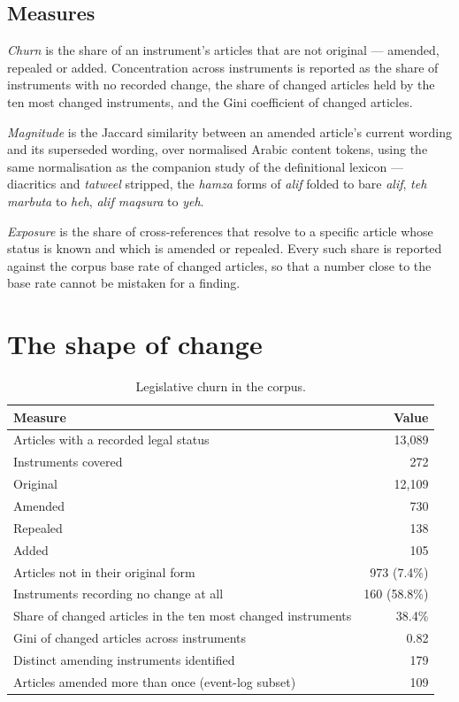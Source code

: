 \documentclass[11pt]{article}
\begin{document}
\subsection{Measures}

\emph{Churn} is the share of an instrument's articles that are not original
--- amended, repealed or added. Concentration across instruments is reported
as the share of instruments with no recorded change, the share of changed
articles held by the ten most changed instruments, and the Gini coefficient of
changed articles.

\emph{Magnitude} is the Jaccard similarity between an amended article's
current wording and its superseded wording, over normalised Arabic content
tokens, using the same normalisation as the companion study of the
definitional lexicon --- diacritics and \emph{tatweel} stripped, the
\emph{hamza} forms of \emph{alif} folded to bare \emph{alif}, \emph{teh
marbuta} to \emph{heh}, \emph{alif maqsura} to \emph{yeh}.

\emph{Exposure} is the share of cross-references that resolve to a specific
article whose status is known and which is amended or repealed. Every such
share is reported against the corpus base rate of changed articles, so that a
number close to the base rate cannot be mistaken for a finding.

\section{The shape of change}

\begin{table}[t]
\centering
\small
\begin{tabular}{lr}
\toprule
\textbf{Measure} & \textbf{Value} \\
\midrule
Articles with a recorded legal status & 13,089 \\
Instruments covered & 272 \\
\midrule
Original & 12,109 \\
Amended & 730 \\
Repealed & 138 \\
Added & 105 \\
\midrule
Articles not in their original form & 973 (7.4\%) \\
\midrule
Instruments recording no change at all & 160 (58.8\%) \\
Share of changed articles in the ten most changed instruments & 38.4\% \\
Gini of changed articles across instruments & 0.82 \\
\midrule
Distinct amending instruments identified & 179 \\
Articles amended more than once (event-log subset) & 109 \\
\bottomrule
\end{tabular}
\caption{Legislative churn in the corpus.}
\label{tab:inventory}
\end{table}
\end{document}
